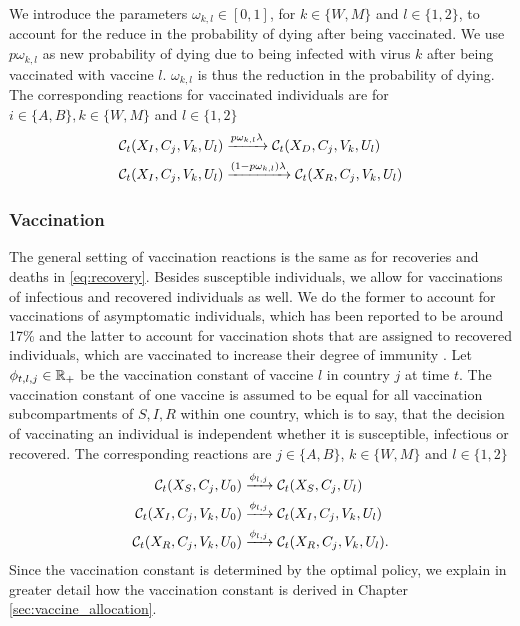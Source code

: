 We introduce the parameters $\omega_{k,l} \in [0,1]$, for $k \in \{W, M\}$ and $l \in \{1,2\}$, to account for the reduce in the probability of dying after being vaccinated. We use $p \omega_{k,l}$ as new probability of dying due to being infected with virus $k$ after being vaccinated with vaccine $l$. $\omega_{k,l}$ is thus the reduction in the probability of dying. The corresponding reactions for vaccinated individuals are for $i \in \{A, B\}, k \in \{W, M\}$ and $l \in \{1,2\}$
\begin{align}
    \mathcal{C}_t(X_I, C_j, V_k, U_l) &\xrightarrow{p \omega_{k,l} \lambda} \mathcal{C}_t(X_D,C_j, V_k, U_l) \\
    \mathcal{C}_t(X_I, C_j, V_k, U_l) &\xrightarrow{(1-p \omega_{k,l}) \lambda} \mathcal{C}_t(X_R,C_j, V_k, U_l) \notag
\end{align}

\subsubsection{Vaccination}
The general setting of vaccination reactions is the same as for recoveries and deaths in \eqref{eq:recovery}. Besides susceptible individuals, we allow for vaccinations of infectious and recovered individuals as well. We do the former to account for vaccinations of asymptomatic individuals, which has been reported to be around 17\% \citep{Byambasuren.2020} and the latter to account for vaccination shots that are assigned to recovered individuals, which are vaccinated to increase their degree of immunity \citep{Skelly.2021}. Let $\phi_{t, l,j} \in \mathbb{R}_+$ be the vaccination constant of vaccine $l$ in country $j$ at time $t$. The vaccination constant of one vaccine is assumed to be equal for all vaccination subcompartments of $S, I,R$ within one country, which is to say, that the decision of vaccinating an individual is independent whether it is susceptible, infectious or recovered.  The corresponding reactions are $j \in \{A,B\}$, $k \in \{W,M\}$ and $l \in \{1,2\}$
\begin{align}
\mathcal{C}_t(X_S, C_j, U_0) &\xrightarrow{\phi_{l, j}} \mathcal{C}_t(X_S, C_j, U_l)  \\
\mathcal{C}_t(X_I, C_j, V_k, U_0) &\xrightarrow{\phi_{l,j}} \mathcal{C}_t(X_I, C_j, V_k, U_l) \notag \\
\mathcal{C}_t(X_R, C_j, V_k, U_0) &\xrightarrow{\phi_{l,j}} \mathcal{C}_t(X_R, C_j, V_k, U_l). \notag
\end{align}
Since the vaccination constant is determined by the optimal policy, we explain in greater detail how the vaccination constant is derived in Chapter \ref{sec:vaccine_allocation}.


